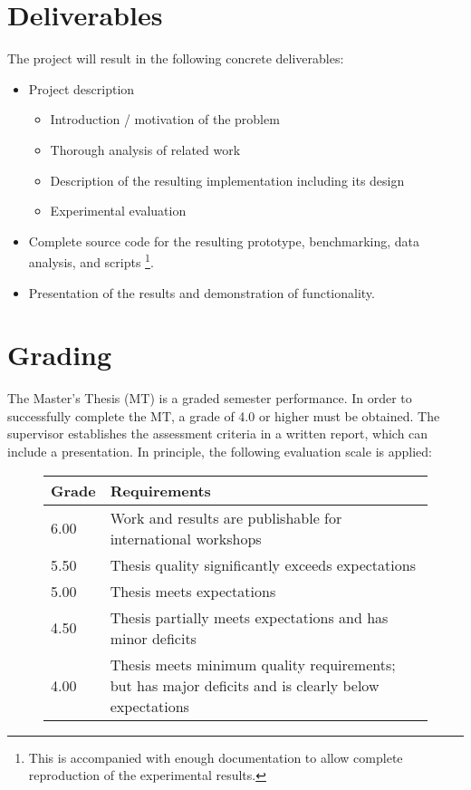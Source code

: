 \documentclass{article}
\begin{document}
\section*{Deliverables}

The project will result in the following concrete deliverables:
\begin{itemize}
    \item Project description 
   \begin{itemize}
       \item Introduction / motivation of the problem
       \item Thorough analysis of related work
       \item Description of the resulting implementation including its design
       \item Experimental evaluation
   \end{itemize}
    \item Complete source code for the resulting prototype, benchmarking, data analysis, and scripts \footnote{This is accompanied with enough documentation to allow complete reproduction of the experimental results.}. %
    \item Presentation of the results and demonstration of functionality.
\end{itemize}


\section*{Grading}

The Master's Thesis (MT) is a graded semester performance. In order to successfully complete the MT, a grade of 4.0 or higher must be obtained.  The supervisor establishes the assessment criteria in a written report, which can include a presentation. In principle, the following evaluation scale is applied: 
\begin{figure}[h!]
    \begin{tabular}{ |l p{10cm}| }
        \hline  Grade & Requirements  \\ \hline \hline
        6.00  & Work and results are publishable for international workshops  \\ \hline
        5.50 & Thesis quality significantly exceeds expectations  \\ \hline
        5.00 & Thesis meets expectations  \\ \hline
        4.50 & Thesis partially meets expectations and has minor deficits   \\ \hline
        4.00 & Thesis meets minimum quality requirements; but has major deficits  and  is  clearly  below expectations \\ \hline 
    \end{tabular}
\end{figure}



\end{document}
